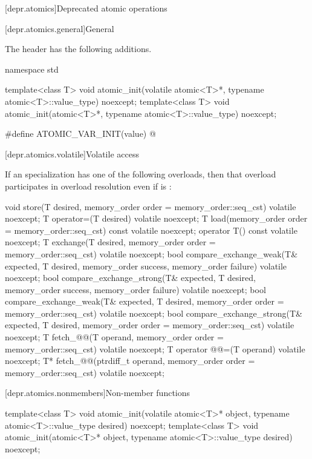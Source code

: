 [depr.atomics]{Deprecated atomic operations}

[depr.atomics.general]{General}

\pnum
The header  has the following additions.

\begin{codeblock}
namespace std {
  template<class T>
    void atomic_init(volatile atomic<T>*, typename atomic<T>::value_type) noexcept;
  template<class T>
    void atomic_init(atomic<T>*, typename atomic<T>::value_type) noexcept;

  #define ATOMIC_VAR_INIT(value) @\seebelow@
}
\end{codeblock}

[depr.atomics.volatile]{Volatile access}

\pnum
If an  specialization has one of the following overloads,
then that overload participates in overload resolution
even if  is :
\begin{codeblock}
void store(T desired, memory_order order = memory_order::seq_cst) volatile noexcept;
T operator=(T desired) volatile noexcept;
T load(memory_order order = memory_order::seq_cst) const volatile noexcept;
operator T() const volatile noexcept;
T exchange(T desired, memory_order order = memory_order::seq_cst) volatile noexcept;
bool compare_exchange_weak(T& expected, T desired,
                           memory_order success, memory_order failure) volatile noexcept;
bool compare_exchange_strong(T& expected, T desired,
                             memory_order success, memory_order failure) volatile noexcept;
bool compare_exchange_weak(T& expected, T desired,
                           memory_order order = memory_order::seq_cst) volatile noexcept;
bool compare_exchange_strong(T& expected, T desired,
                             memory_order order = memory_order::seq_cst) volatile noexcept;
T fetch_@@(T operand, memory_order order = memory_order::seq_cst) volatile noexcept;
T operator @@=(T operand) volatile noexcept;
T* fetch_@@(ptrdiff_t operand, memory_order order = memory_order::seq_cst) volatile noexcept;
\end{codeblock}

[depr.atomics.nonmembers]{Non-member functions}

%
\begin{itemdecl}
template<class T>
  void atomic_init(volatile atomic<T>* object, typename atomic<T>::value_type desired) noexcept;
template<class T>
  void atomic_init(atomic<T>* object, typename atomic<T>::value_type desired) noexcept;
\end{itemdecl}

